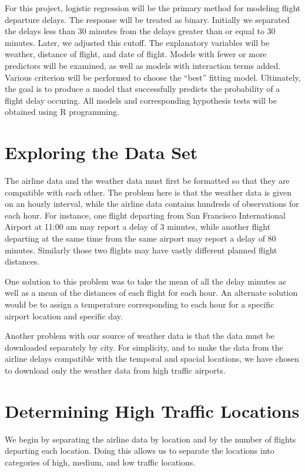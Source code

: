 \documentclass{asaproc}
\begin{document}
For this project, logistic regression will be the primary method for modeling flight departure delays.
The response will be treated as binary. Initially we separated the delays less than 30 minutes from the delays greater than or equal to 30 minutes. Later, we adjusted this cutoff. The explanatory variables will be weather, distance of flight, and date of flight. Models with fewer or more predictors will be examined, as well as models with interaction terms added. Various criterion will be performed to choose the ``best'' fitting model. Ultimately, the goal is to produce a model that successfully predicts the probability of a flight delay occuring. All models and corresponding hypothesis tests will be obtained using R programming. 


\section{Exploring the Data Set}

The airline data and the weather data must first be formatted so that they are compatible with each other. The problem here is that the weather data is given on an hourly interval, while the airline data contains hundreds of observations for each hour. For instance, one flight departing from San Francisco International Airport at 11:00 am may report a delay of 3 minutes, while another flight departing at the same time from the same airport may report a delay of 80 minutes. Similarly those two flights may have vastly different planned flight distances.

One solution to this problem was to take the mean of all the delay minutes as well as a mean of the distances of each flight for each hour. An alternate solution would be to assign a temperature corresponding to each hour for a specific airport location and specific day.

Another problem with our source of weather data is that the data must be downloaded separately by city. For simplicity, and to make the data from the airline delays compatible with the temporal and spacial locations, we have chosen to download only the weather data from high traffic airports.

\section{Determining High Traffic Locations}
We begin by separating the airline data by location and by the number of flights departing each location. Doing this allows us to separate the locations into categories of high, medium, and low traffic locations.
\end{document}
